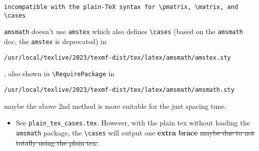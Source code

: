 \documentclass{article}
\begin{document}
\begin{enumerate}
\begin{itemize}
\begin{lstlisting}
incompatible with the plain-TeX syntax for \pmatrix, \matrix, and \cases
                    \end{lstlisting}
                    \verb|amsmath| doesn't use \verb|amstex| which also defines \verb|\cases| (based on the \verb|amsmath| doc, the \verb|amstex| is deprecated) in \begin{lstlisting}
/usr/local/texlive/2023/texmf-dist/tex/latex/amsmath/amstex.sty
                    \end{lstlisting}
                    \verb||, also shown in \verb|\RequirePackage| in
                    \begin{lstlisting}
/usr/local/texlive/2023/texmf-dist/tex/latex/amsmath/amsmath.sty
                    \end{lstlisting}

                    maybe the above 2nd method is more suitable for the just spacing tune.
                    \begin{itemize}
                        \item See \verb|plain_tex_cases.tex|. However, with the plain tex without loading the \verb|amsmath| package, the \verb|\cases| will output one \textbf{extra brace} \sout{maybe due to not totally using the plain tex.}


\end{itemize}
\end{itemize}
\end{enumerate}
\end{document}
